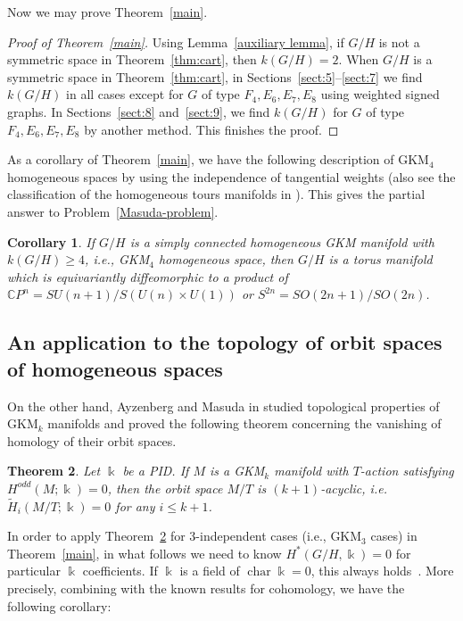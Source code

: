 \documentclass{amsart}
\newtheorem{theorem}{Theorem}[section]
\newtheorem{corollary}[theorem]{Corollary}
\theoremstyle{definition}
\theoremstyle{remark}
\numberwithin{equation}{section}
\DeclareMathOperator{\chr}{char}
\begin{document}
Now we may prove Theorem~\ref{main}.
\begin{proof}[Proof of Theorem~\ref{main}]
Using Lemma~\ref{auxiliary lemma}, 
if $G/H$ is not a symmetric space in Theorem~\ref{thm:cart}, then $k(G/H)=2$.
When $G/H$ is a symmetric space in Theorem~\ref{thm:cart},
in Sections~\ref{sect:5}--\ref{sect:7} we find $k(G/H)$ in all cases except for $G$ of type $F_{4},E_{6},E_{7},E_{8}$ using weighted signed graphs.
In Sections~\ref{sect:8} and~\ref{sect:9}, we find $k(G/H)$ for $G$ of type $F_{4},E_{6},E_{7},E_{8}$ by another method.
This finishes the proof.
\end{proof}

As a corollary of Theorem~\ref{main}, we have the following description of GKM$_{4}$ homogeneous spaces by using the independence of tangential weights (also see the classification of the homogeneous tours manifolds in \cite{Ku10}).
This gives the partial answer to Problem~\ref{Masuda-problem}. 

\begin{corollary}
If $G/H$ is a simply connected homogeneous GKM manifold with $k(G/H)\ge 4$, i.e., GKM$_{4}$ homogeneous space, then $G/H$ is a torus manifold which is equivariantly diffeomorphic to a product of $\mathbb{C}P^{n}=SU(n+1)/S(U(n)\times U(1))$ or $S^{2n}=SO(2n+1)/SO(2n)$.
\end{corollary}

\subsection{An application to the topology of orbit spaces of homogeneous spaces}
\label{sect:3.3}
On the other hand, Ayzenberg and Masuda in \cite{AM} studied topological properties of GKM$_{k}$ manifolds and proved the following theorem concerning the vanishing of homology of their orbit spaces.

\begin{theorem}\cite[Theorem 2]{AM}\label{thm:AM}
Let $\Bbbk$ be a PID.
If $M$ is a GKM$_{k}$ manifold with $T$-action satisfying $H^{odd}(M;\Bbbk)=0$, then the orbit space $M/T$ is $(k+1)$-acyclic, i.e. $\widetilde{H}_{i}(M/T;\Bbbk)=0$ for any $i\leq k+1$.
\end{theorem}
In order to apply Theorem~\ref{thm:AM} for $3$-independent cases (i.e., GKM$_{3}$ cases) in Theorem~\ref{main},
in what follows we need to know $H^{*}(G/H,\Bbbk)=0$ for particular $\Bbbk$ coefficients.
If $\Bbbk$ is a field of $\chr \Bbbk=0$, this always holds~\cite[Prop. 30.2]{B53}.
More precisely, combining with the known results for cohomology, we have the following corollary:
\end{document}
